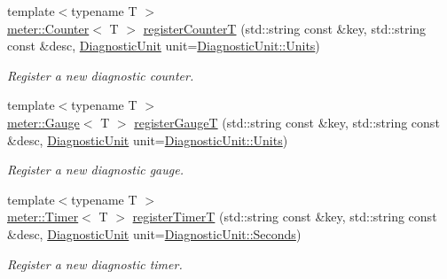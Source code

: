 \begin{DoxyCompactItemize}
{\footnotesize template$<$typename T $>$ }\\\hyperlink{structvt_1_1runtime_1_1component_1_1meter_1_1_counter}{meter\+::\+Counter}$<$ T $>$ \hyperlink{structvt_1_1runtime_1_1component_1_1_diagnostic_abb1ee7f09f05c143dbdfd3346f6cdcba}{register\+CounterT} (std\+::string const \&key, std\+::string const \&desc, \hyperlink{namespacevt_1_1runtime_1_1component_a99ec18b08862c712176126bb7d0e307a}{Diagnostic\+Unit} unit=\hyperlink{namespacevt_1_1runtime_1_1component_a99ec18b08862c712176126bb7d0e307aae5771a362d88a71a657bfcd21ca54b3f}{Diagnostic\+Unit\+::\+Units})
\begin{DoxyCompactList}\small\item\em Register a new diagnostic counter. \end{DoxyCompactList}\item 
{\footnotesize template$<$typename T $>$ }\\\hyperlink{structvt_1_1runtime_1_1component_1_1meter_1_1_gauge}{meter\+::\+Gauge}$<$ T $>$ \hyperlink{structvt_1_1runtime_1_1component_1_1_diagnostic_aa220905292aeb726254d3dff2e672b00}{register\+GaugeT} (std\+::string const \&key, std\+::string const \&desc, \hyperlink{namespacevt_1_1runtime_1_1component_a99ec18b08862c712176126bb7d0e307a}{Diagnostic\+Unit} unit=\hyperlink{namespacevt_1_1runtime_1_1component_a99ec18b08862c712176126bb7d0e307aae5771a362d88a71a657bfcd21ca54b3f}{Diagnostic\+Unit\+::\+Units})
\begin{DoxyCompactList}\small\item\em Register a new diagnostic gauge. \end{DoxyCompactList}\item 
{\footnotesize template$<$typename T $>$ }\\\hyperlink{structvt_1_1runtime_1_1component_1_1meter_1_1_timer}{meter\+::\+Timer}$<$ T $>$ \hyperlink{structvt_1_1runtime_1_1component_1_1_diagnostic_a328ecca78c6aa309bb764f3dde083c3e}{register\+TimerT} (std\+::string const \&key, std\+::string const \&desc, \hyperlink{namespacevt_1_1runtime_1_1component_a99ec18b08862c712176126bb7d0e307a}{Diagnostic\+Unit} unit=\hyperlink{namespacevt_1_1runtime_1_1component_a99ec18b08862c712176126bb7d0e307aa8f19a8c7566af54ea8981029730e5465}{Diagnostic\+Unit\+::\+Seconds})
\begin{DoxyCompactList}\small\item\em Register a new diagnostic timer. \end{DoxyCompactList}\item 

\end{DoxyCompactItemize}

